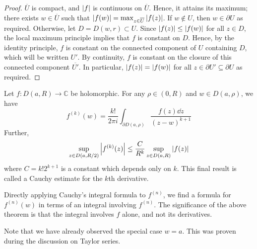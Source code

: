 \begin{proof}
	\( \overline U \) is compact, and \( \abs{f} \) is continuous on \( \overline U \).
	Hence, it attains its maximum; there exists \( w \in \overline U \) such that \( \abs{f(w)} = \max_{z \in \overline U} \abs{f(z)} \).
	If \( w \not\in U \), then \( w \in \partial U \) as required.
	Otherwise, let \( D = D(w,r) \subset U \).
	Since \( \abs{f(z)} \leq \abs{f(w)} \) for all \( z \in D \), the local maximum principle implies that \( f \) is constant on \( D \).
	Hence, by the identity principle, \( f \) is constant on the connected component of \( U \) containing \( D \), which will be written \( U' \).
	By continuity, \( f \) is constant on the closure of this connected component \( \overline{U'} \).
	In particular, \( \abs{f(z)} = \abs{f(w)} \) for all \( z \in \partial U' \subseteq \partial U \) as required.
\end{proof}
\begin{theorem}
	Let \( f \colon D(a,R) \to \mathbb C \) be holomorphic.
	For any \( \rho \in (0,R) \) and \( w \in D(a,\rho) \), we have
	\[
		f^{(k)}(w) = \frac{k!}{2\pi i} \int_{\partial D(a,\rho)} \frac{f(z) \dd{z}}{(z-w)^{k+1}}
	\]
	Further,
	\[
		\sup_{z \in D(a,R/2)} \abs{f^{(k)}(z)} \leq \frac{C}{R^k} \sup_{z \in D(a,R)} \abs{f(z)}
	\]
	where \( C = k!
	2^{k+1} \) is a constant which depends only on \( k \).
	This final result is called a Cauchy estimate for the \( k \)th derivative.
\end{theorem}
\begin{remark}
	Directly applying Cauchy's integral formula to \( f^{(n)} \), we find a formula for \( f^{(n)}(w) \) in terms of an integral involving \( f^{(n)} \).
	The significance of the above theorem is that the integral involves \( f \) alone, and not its derivatives.

	Note that we have already observed the special case \( w = a \).
	This was proven during the discussion on Taylor series.
\end{remark}
